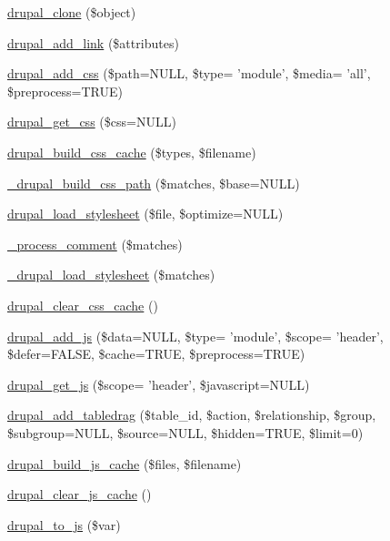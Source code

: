 \begin{CompactItemize}
\item 
\hyperlink{common_8inc_14f9e44c0897f4950c1714483a811fc8}{drupal\_\-clone} (\$object)
\item 
\hyperlink{common_8inc_7eda2691396ef26c49e05d37a43bddfd}{drupal\_\-add\_\-link} (\$attributes)
\item 
\hyperlink{common_8inc_21f9e8d23b62a313faddaf211d7cc610}{drupal\_\-add\_\-css} (\$path=NULL, \$type= 'module', \$media= 'all', \$preprocess=TRUE)
\item 
\hyperlink{common_8inc_90f269c442c46417319a614057985a0c}{drupal\_\-get\_\-css} (\$css=NULL)
\item 
\hyperlink{common_8inc_e7fa84b77f1c157964f0105d9b4a9476}{drupal\_\-build\_\-css\_\-cache} (\$types, \$filename)
\item 
\hyperlink{common_8inc_f634d8ae0731015c73e039895890b42b}{\_\-drupal\_\-build\_\-css\_\-path} (\$matches, \$base=NULL)
\item 
\hyperlink{common_8inc_f20aa4e55e7003eaff27f5c6078a4ae0}{drupal\_\-load\_\-stylesheet} (\$file, \$optimize=NULL)
\item 
\hyperlink{common_8inc_5e60d91d60360fdbe187b7f7b7b60797}{\_\-process\_\-comment} (\$matches)
\item 
\hyperlink{common_8inc_79a5c2b6f50963f2e185b6c34d6bd10e}{\_\-drupal\_\-load\_\-stylesheet} (\$matches)
\item 
\hyperlink{common_8inc_e89dbd2b41a6623be2ed704d039a5c7c}{drupal\_\-clear\_\-css\_\-cache} ()
\item 
\hyperlink{common_8inc_a20ac74a08756427706432aa6bb33139}{drupal\_\-add\_\-js} (\$data=NULL, \$type= 'module', \$scope= 'header', \$defer=FALSE, \$cache=TRUE, \$preprocess=TRUE)
\item 
\hyperlink{common_8inc_56994274f0ab2fb17c15b41bcdbd81ce}{drupal\_\-get\_\-js} (\$scope= 'header', \$javascript=NULL)
\item 
\hyperlink{common_8inc_b905af5d90a84b5d48f3a517992875f5}{drupal\_\-add\_\-tabledrag} (\$table\_\-id, \$action, \$relationship, \$group, \$subgroup=NULL, \$source=NULL, \$hidden=TRUE, \$limit=0)
\item 
\hyperlink{common_8inc_1e8a20aeb8dd9bd6e03988936c42feb8}{drupal\_\-build\_\-js\_\-cache} (\$files, \$filename)
\item 
\hyperlink{common_8inc_c05e083cb7cb02084601f8d2103b0405}{drupal\_\-clear\_\-js\_\-cache} ()
\item 
\hyperlink{common_8inc_99da8b132160dbf03c14388e92cd9baf}{drupal\_\-to\_\-js} (\$var)
\item 

\end{CompactItemize}
